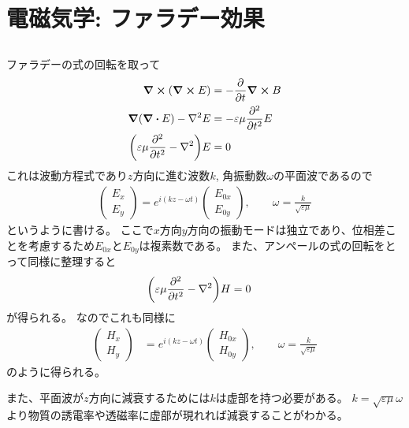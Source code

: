 \documentclass[../../master.tex]{subfiles}
\begin{document}
\chapter{電磁気学: ファラデー効果}
\section{}
ファラデーの式の回転を取って
\begin{align}
    \curl(\curl E) &= -\pdv{t} \curl B\\
    \grad(\div E) - \laplacian{E} &= -\varepsilon\mu \pdv[2]{t}E\\
    \qty(\varepsilon\mu\pdv[2]{t}-\laplacian)E &= 0
\end{align}
これは波動方程式であり\(z\)方向に進む波数\(k\), 角振動数\(\omega\)の平面波であるので
\begin{align}
    \begin{pmatrix}
        E_x\\ E_y
    \end{pmatrix}
    = e^{i(kz-\omega t)}\begin{pmatrix}
        E_{0x} \\
        E_{0y}
    \end{pmatrix},\qquad
    \omega = \frac{k}{\sqrt{\varepsilon\mu}}
\end{align}
というように書ける。
ここで\(x\)方向\(y\)方向の振動モードは独立であり、位相差ことを考慮するため\(E_{0x}\)と\(E_{0y}\)は複素数である。
また、アンペールの式の回転をとって同様に整理すると
\begin{align}
    \qty(\varepsilon\mu\pdv[2]{t}-\laplacian)H &= 0
\end{align}
が得られる。
なのでこれも同様に
\begin{align}
    \begin{pmatrix}
        H_x\\ H_y
    \end{pmatrix}
    &= e^{i(kz-\omega t)}\begin{pmatrix}
        H_{0x} \\
        H_{0y}
    \end{pmatrix},\qquad
    \omega = \frac{k}{\sqrt{\varepsilon\mu}}
\end{align}
のように得られる。

また、平面波が\(z\)方向に減衰するためには\(k\)は虚部を持つ必要がある。
\(k=\sqrt{\varepsilon\mu}\omega\)より物質の誘電率や透磁率に虚部が現れれば減衰することがわかる。
\end{document}
